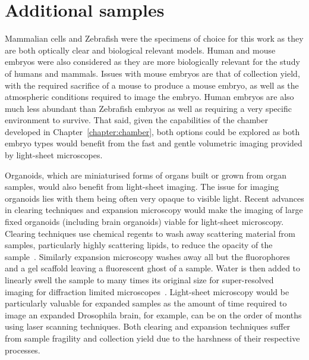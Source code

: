 \section{Additional samples}

Mammalian cells and Zebrafish were the specimens of choice for this work as they are both optically clear and biological relevant models.
Human and mouse embryos were also considered as they are more biologically relevant for the study of humans and mammals.
Issues with mouse embryos are that of collection yield, with the required sacrifice of a mouse to produce a mouse embryo, as well as the atmospheric conditions required to image the embryo.
Human embryos are also much less abundant than Zebrafish embryos as well as requiring a very specific environment to survive.
That said, given the capabilities of the chamber developed in Chapter~\ref{chapter:chamber}, both options could be explored as both embryo types would benefit from the fast and gentle volumetric imaging provided by light-sheet microscopes.

Organoids, which are miniaturised forms of organs built or grown from organ samples, would also benefit from light-sheet imaging.
The issue for imaging organoids lies with them being often very opaque to visible light.
Recent advances in clearing techniques and expansion microscopy would make the imaging of large fixed organoids (including brain organoids) viable for light-sheet microscopy.
Clearing techniques use chemical regents to wash away scattering material from samples, particularly highly scattering lipids, to reduce the opacity of the sample~\cite{_clearing_2016}. %
Similarly expansion microscopy washes away all but the fluorophores and a gel scaffold leaving a fluorescent ghost of a sample.
Water is then added to linearly swell the sample to many times its original size for super-resolved imaging for diffraction limited microscopes~\cite{chen_expansion_2015}.
Light-sheet microscopy would be particularly valuable for expanded samples as the amount of time required to image an expanded Drosophila brain, for example, can be on the order of months using laser scanning techniques.
Both clearing and expansion techniques suffer from sample fragility and collection yield due to the harshness of their respective processes.

